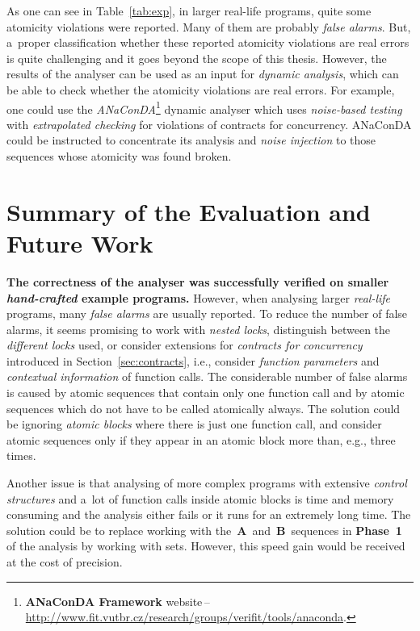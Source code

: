 As one can see in Table~\ref{tab:exp}, in larger real-life programs,
quite some atomicity violations were reported. Many of them are
probably \emph{false alarms}. But, a~proper classification whether 
these reported atomicity violations are real errors is quite
challenging and it goes beyond the scope of this thesis. However, the 
results of the analyser can be used as an input for \emph{dynamic analysis},
which can be able to check whether the atomicity violations are real 
errors. For example, one could use the 
\emph{ANaConDA}\footnote{\textbf{ANaConDA Framework} website\,--\,%
\url{http://www.fit.vutbr.cz/research/groups/verifit/tools/anaconda}.} 
dynamic analyser which uses \emph{noise-based testing} with 
\emph{extrapolated checking} for violations of contracts for concurrency.
ANaConDA could be instructed to concentrate its analysis and \emph{noise
injection} to those sequences whose atomicity was found broken.


\section{Summary of the Evaluation and Future Work}
\label{sec:expSum}

\textbf{The correctness of the analyser was successfully verified on smaller
\emph{hand-crafted} example programs.} However, when analysing larger
\emph{real-life} programs, many \emph{false alarms} are usually reported.
To reduce the number of false alarms, it seems promising to work with
\emph{nested locks}, distinguish between the \emph{different locks} used,
or consider extensions for \emph{contracts for concurrency} introduced in
Section~\ref{sec:contracts}, i.e., consider \emph{function parameters} and
\emph{contextual information} of function calls. The considerable
number of false alarms is caused by atomic sequences that contain only
one function call and by atomic sequences which do not have to be called
atomically always. The solution could be ignoring \emph{atomic blocks} where
there is just one function call, and consider atomic sequences only if
they appear in an atomic block more than, e.g., three times.

Another issue is that analysing of more complex programs with extensive
\emph{control structures} and a~lot of function calls inside atomic blocks
is time and memory consuming and the analysis either fails or it
runs for an extremely long time. The solution could be to replace
working with the~\textbf{A}~and~\textbf{B}~sequences in \textbf{Phase~1} of
the analysis by working with sets. However, this speed gain would be
received at the cost of precision.



